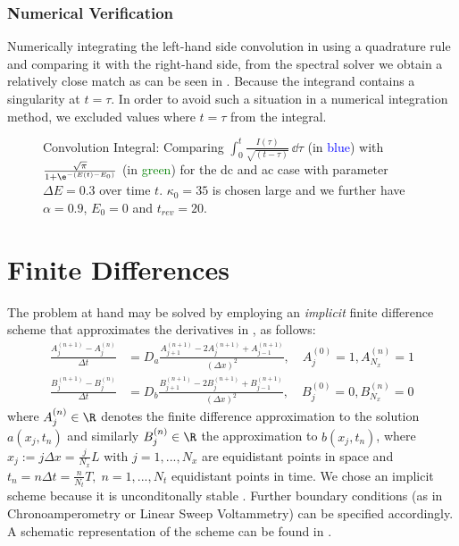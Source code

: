 \documentclass{prettytex/ox/mmsc-special-topic}
\begin{document}
  \subsubsection{Numerical Verification}
  Numerically integrating the left-hand side convolution in  using a quadrature rule and comparing it with the right-hand side, from the spectral solver we obtain a relatively close match as can be seen in .
  Because the integrand contains a singularity at $t = \tau$.
  In order to avoid such a situation in a numerical integration method, we excluded values where $t = \tau$ from the integral.
  \begin{figure}[H]
    \centering
    \caption{Convolution Integral: Comparing $\int_{0}^{t} \frac{I(\tau)}{\sqrt{(t - \tau)}} \,\dd\tau$ (in \textcolor{blue}{blue}) with $\frac{\sqrt{\pi}}{1 + \e^{-(E(t) - E_0)}}$ (in \textcolor{green}{green}) for the \gls{dc} and \gls{ac} case with parameter $\Delta E = 0.3$ over time $t$. $\kappa_0 = 35$ is chosen large and we further have $\alpha = 0.9$, $E_0 = 0$ and $t_{rev} = 20$.}
    \label{fig:voltammetry-convolution}
  \end{figure}

  \section{Finite Differences}
  \label{sec:finite-differences}
  The problem at hand may be solved by employing an \emph{implicit} finite difference scheme that approximates the derivatives in , as follows:
  \begin{align}
    \label{eq:fd-scheme-a} \frac{A_{j}^{(n+1)} - A_{j}^{(n)}}{\Delta t} & = D_a \frac{A_{j+1}^{(n+1)} - 2 A_{j}^{(n+1)} + A_{j-1}^{(n+1)}}{(\Delta x)^2}, \quad A_j^{(0)} = 1, A_{N_x}^{(n)} = 1 \\
    \label{eq:fd-scheme-b} \frac{B_{j}^{(n+1)} - B_{j}^{(n)}}{\Delta t} & = D_b \frac{B_{j+1}^{(n+1)} - 2 B_{j}^{(n+1)} + B_{j-1}^{(n+1)}}{(\Delta x)^2}, \quad B_j^{(0)} = 0, B_{N_x}^{(n)} = 0
  \end{align}
  where $A_j^{(n)} \in \R$ denotes the finite difference approximation to the solution $a(x_j, t_n)$ and similarly $B_j^{(n)} \in \R$ the approximation to $b(x_j, t_n)$, where $x_j := j \Delta x = \frac{j}{N_x} L$ with $j = 1, ..., N_x$ are equidistant points in space and $t_n = n \Delta t = \frac{n}{N_t} T,\; n = 1, ..., N_t$ equidistant points in time.
  We chose an implicit scheme because it is unconditonally stable \parencite{süli_mayers_2003}.
  Further boundary conditions (as in Chronoamperometry or Linear Sweep Voltammetry) can be specified accordingly.
  A schematic representation of the scheme can be found in .
\end{document}
